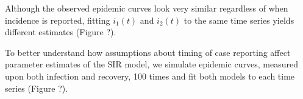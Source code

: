 \documentclass{article}\usepackage[]{graphicx}\usepackage[]{color}
\begin{document}
Although the observed epidemic curves look very similar regardless of when incidence
is reported, fitting $i_1(t)$ and $i_2(t)$ to the same time series yields different
estimates (Figure ?). 

To better understand how assumptions about timing of case reporting affect parameter
estimates of the SIR model, we simulate epidemic curves, measured upon both infection and
recovery, 100 times and fit both models to each time series (Figure ?).













\end{document}

